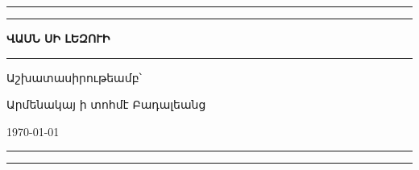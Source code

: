 
\begin{titlepage}
\begingroup
\newlength\drop{}\textheight

\setlength{\parindent}{0pt}

\rule{\textwidth}{1pt}\par
\vspace{2pt}\vspace{-\baselineskip}
\rule{\textwidth}{0.4pt}\par

\vspace\drop
\centering

{\fontsize{42}{42}\selectfont\textbf{ՎԱՍՆ ՍԻ ԼԵԶՈՒԻ}}
\null\vskip12pt\null

\vspace{0.25\drop}
\rule{0.3\textwidth}{0.4pt}\par
\vspace{\drop}

\centerline{{\Large Աշխատասիրութեամբ՝}}
\medskip
\centerline{{\Large Արմենակայ ի տոհմէ Բադալեանց}}

\vfill

{\large\today}

\rule{\textwidth}{0.4pt}\par
\vspace{2pt}\vspace{-\baselineskip}
\rule{\textwidth}{1pt}\par

\endgroup

\end{titlepage}

\begin{titlepage}
\null
\end{titlepage}
